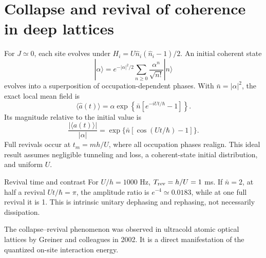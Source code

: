 \documentclass[11pt,a4paper]{article}
\begin{document}
\section{Collapse and revival of coherence in deep lattices}
For $J\simeq0$, each site evolves under $H_i=U\hat n_i(\hat n_i-1)/2$. An initial coherent state
\begin{equation}|\alpha\rangle=e^{-|\alpha|^2/2}\sum_{n\ge0}\frac{\alpha^n}{\sqrt{n!}}|n\rangle\end{equation}
evolves into a superposition of occupation-dependent phases. With $\bar n=|\alpha|^2$, the exact local mean field is
\begin{equation}\boxed{\langle\hat a(t)\rangle=\alpha\exp\left\{\bar n\left[e^{-iUt/\hbar}-1\right]\right\}.}\end{equation}
Its magnitude relative to the initial value is
\begin{equation}\frac{|\langle a(t)\rangle|}{|\alpha|}=\exp\{\bar n[\cos(Ut/\hbar)-1]\}.\end{equation}
Full revivals occur at $t_m=mh/U$, where all occupation phases realign. This ideal result assumes negligible tunneling and loss, a coherent-state initial distribution, and uniform $U$.
\begin{worked}{Revival time and contrast}
For $U/h=1000$ Hz, $T_{\rm rev}=h/U=1$ ms. If $\bar n=2$, at half a revival $Ut/\hbar=\pi$, the amplitude ratio is $e^{-4}\simeq0.0183$, while at one full revival it is 1. This is intrinsic unitary dephasing and rephasing, not necessarily dissipation.
\end{worked}
\begin{center}\end{center}
The collapse--revival phenomenon was observed in ultracold atomic optical lattices by Greiner and colleagues in 2002. It is a direct manifestation of the quantized on-site interaction energy.
\end{document}
